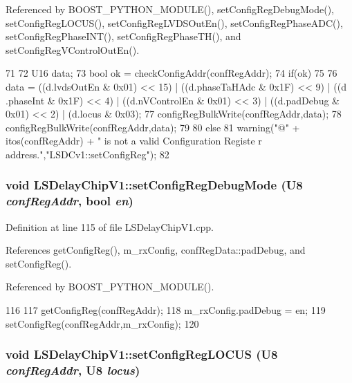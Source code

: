 Referenced by BOOST\_\-PYTHON\_\-MODULE(), setConfigRegDebugMode(), setConfigRegLOCUS(), setConfigRegLVDSOutEn(), setConfigRegPhaseADC(), setConfigRegPhaseINT(), setConfigRegPhaseTH(), and setConfigRegVControlOutEn().


\begin{DoxyCode}
71 {
72     U16 data;
73     bool ok = checkConfigAddr(confRegAddr);
74     if(ok)
75     {
76         data = ((d.lvdsOutEn & 0x01) << 15) | ((d.phaseTaHAdc & 0x1F) << 9) | ((d
      .phaseInt & 0x1F) << 4) | ((d.nVControlEn & 0x01) << 3) | ((d.padDebug & 0x01) <<
       2) | (d.locus & 0x03);
77         configRegBulkWrite(confRegAddr,data);
78 configRegBulkWrite(confRegAddr,data);   
79     }
80     else
81          warning("@" + itos(confRegAddr) + " is not a valid Configuration Registe
      r address.","LSDCv1::setConfigReg");    
82 }
\end{DoxyCode}
\hypertarget{classLSDelayChipV1_a813eca3585445d504d60a93ec55817f4}{
\subsubsection[{setConfigRegDebugMode}]{\setlength{\rightskip}{0pt plus 5cm}void LSDelayChipV1::setConfigRegDebugMode ({\bf U8} {\em confRegAddr}, \/  bool {\em en})}}
\label{classLSDelayChipV1_a813eca3585445d504d60a93ec55817f4}


Definition at line 115 of file LSDelayChipV1.cpp.

References getConfigReg(), m\_\-rxConfig, confRegData::padDebug, and setConfigReg().

Referenced by BOOST\_\-PYTHON\_\-MODULE().


\begin{DoxyCode}
116 {
117     getConfigReg(confRegAddr);
118     m_rxConfig.padDebug = en;
119     setConfigReg(confRegAddr,m_rxConfig);
120 }
\end{DoxyCode}
\hypertarget{classLSDelayChipV1_a2a1eebeacb7ed2b0fc5584f3630d0aa0}{
\subsubsection[{setConfigRegLOCUS}]{\setlength{\rightskip}{0pt plus 5cm}void LSDelayChipV1::setConfigRegLOCUS ({\bf U8} {\em confRegAddr}, \/  {\bf U8} {\em locus})}}
\label{classLSDelayChipV1_a2a1eebeacb7ed2b0fc5584f3630d0aa0}


